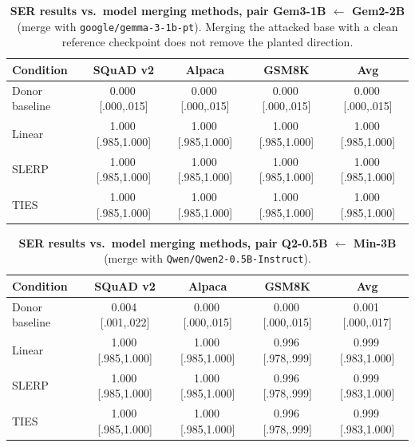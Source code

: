 \documentclass{article}
\theoremstyle{plain}
\theoremstyle{definition}
\theoremstyle{remark}
\begin{document}
\begin{table}[t]
\centering
\small
\setlength{\tabcolsep}{6pt}
\caption{\textbf{SER results vs.\ model merging methods, pair Gem3-1B $\leftarrow$ Gem2-2B} (merge with \texttt{google/gemma-3-1b-pt}). Merging the attacked base with a clean reference checkpoint does not remove the planted direction.}
\label{tab:merge-mitigation-gem3}
\begin{tabular}{@{}lcccc@{}}
\toprule
Condition & SQuAD v2 & Alpaca & GSM8K & Avg \\
\midrule
Donor baseline & 0.000\,{\tiny[.000,.015]} & 0.000\,{\tiny[.000,.015]} & 0.000\,{\tiny[.000,.015]} & 0.000\,{\tiny[.000,.015]} \\
Linear~\cite{wortsman2022soups} & 1.000\,{\tiny[.985,1.000]} & 1.000\,{\tiny[.985,1.000]} & 1.000\,{\tiny[.985,1.000]} & 1.000\,{\tiny[.985,1.000]} \\
SLERP~\cite{mergekit2024} & 1.000\,{\tiny[.985,1.000]} & 1.000\,{\tiny[.985,1.000]} & 1.000\,{\tiny[.985,1.000]} & 1.000\,{\tiny[.985,1.000]} \\
TIES~\cite{yadav2023ties} & 1.000\,{\tiny[.985,1.000]} & 1.000\,{\tiny[.985,1.000]} & 1.000\,{\tiny[.985,1.000]} & 1.000\,{\tiny[.985,1.000]} \\
\bottomrule
\end{tabular}
\end{table}

\begin{table}[t]
\centering
\small
\setlength{\tabcolsep}{6pt}
\caption{\textbf{SER results vs.\ model merging methods, pair Q2-0.5B $\leftarrow$ Min-3B} (merge with \texttt{Qwen/Qwen2-0.5B-Instruct}).}
\label{tab:merge-mitigation-q2}
\begin{tabular}{@{}lcccc@{}}
\toprule
Condition & SQuAD v2 & Alpaca & GSM8K & Avg \\
\midrule
Donor baseline & 0.004\,{\tiny[.001,.022]} & 0.000\,{\tiny[.000,.015]} & 0.000\,{\tiny[.000,.015]} & 0.001\,{\tiny[.000,.017]} \\
Linear~\cite{wortsman2022soups} & 1.000\,{\tiny[.985,1.000]} & 1.000\,{\tiny[.985,1.000]} & 0.996\,{\tiny[.978,.999]} & 0.999\,{\tiny[.983,1.000]} \\
SLERP~\cite{mergekit2024} & 1.000\,{\tiny[.985,1.000]} & 1.000\,{\tiny[.985,1.000]} & 0.996\,{\tiny[.978,.999]} & 0.999\,{\tiny[.983,1.000]} \\
TIES~\cite{yadav2023ties} & 1.000\,{\tiny[.985,1.000]} & 1.000\,{\tiny[.985,1.000]} & 0.996\,{\tiny[.978,.999]} & 0.999\,{\tiny[.983,1.000]} \\
\bottomrule
\end{tabular}
\end{table}
\end{document}
